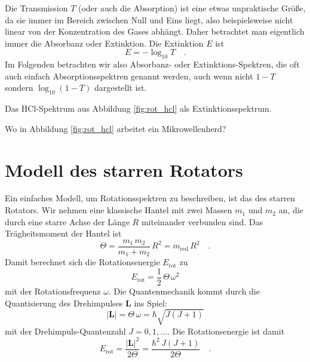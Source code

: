 Die Transmission $T$ (oder auch die Absorption) ist eine etwas unpraktische Größe, da sie immer im Bereich zwischen Null und Eins liegt, also beispielsweise nicht linear von der Konzentration des Gases abhängt. Daher betrachtet man eigentlich immer die Absorbanz oder Extinktion. Die Extinktion $E$ ist
%
\begin{equation}
 E = - \log_{10} T \quad .
\end{equation}
%
Im Folgenden betrachten wir also Absorbanz- oder Extinktions-Spektren, die oft auch einfach Absorptionsspektren genannt werden, auch wenn nicht $1-T$ sondern $\log_{10} ( 1- T)$ dargestellt ist.

\begin{marginfigure}
\caption{Das HCl-Spektrum aus Abbildung \ref{fig:rot_hcl} als Extinktionsspektrum.}
\end{marginfigure}


\begin{questions} 
\item Wo in  Abbildung  \ref{fig:rot_hcl} arbeitet ein Mikrowellenherd?
\end{questions}


\section{Modell des starren Rotators}

Ein einfaches Modell, um Rotationsspektren zu beschreiben, ist das des starren Rotators. Wir nehmen eine klassische Hantel mit zwei Massen $m_1$ und $m_2$ an, die durch eine starre Achse der Länge $R$ miteinander verbunden sind. Das Trägheitsmoment der Hantel ist
\begin{equation}
 \Theta = \frac{m_1 \, m_2}{m_1 + m_2} \, R^2 = m_\text{red} \, R^2 \quad .
\end{equation}
Damit berechnet sich die Rotationsenergie $E_\text{rot}$ zu
\begin{equation}
 E_\text{rot} = \frac{1}{2} \, \Theta \, \omega^2
\end{equation}
mit der Rotationsfrequenz $\omega$. Die Quantenmechanik kommt durch die Quantisierung des Drehimpulses $\mathbf{L} $ ins Spiel:
\begin{equation}
 | \mathbf{L} | = \Theta \, \omega = \hbar \sqrt{J (J + 1)}
\end{equation}
mit der Drehimpuls-Quantenzahl $J = 0, 1, \dots$. Die Rotationsenergie ist damit
\begin{equation}
 E_\text{rot} = \frac{ | \mathbf{L} |^2}{2 \Theta} = \frac{\hbar^2 \, J (J+1)}{2 \Theta} \quad .
\end{equation}

